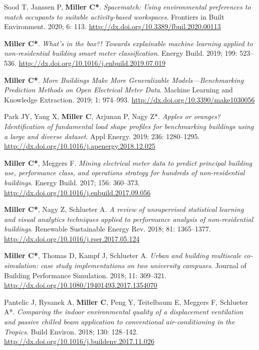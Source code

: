 \documentclass[10pt,a4paper]{article}
\begin{document}
\begin{small}
\begin{etaremune}
\item
Sood T, Janssen P, \textbf{Miller C*}. \emph{Spacematch: Using environmental preferences to match occupants to suitable activity-based workspaces}. Frontiers in Built Environment. 2020; 6: 113. \url{http://dx.doi.org/10.3389/fbuil.2020.00113}
\item
\textbf{Miller C*}. \emph{What’s in the box?! Towards explainable machine learning applied to non-residential building smart meter classification}. Energy Build. 2019; 199: 523–536. \url{http://dx.doi.org/10.1016/j.enbuild.2019.07.019}
\item
\textbf{Miller C*}. \emph{More Buildings Make More Generalizable Models—Benchmarking Prediction Methods on Open Electrical Meter Data}. Machine Learning and Knowledge Extraction. 2019; 1: 974–993. \url{http://dx.doi.org/10.3390/make1030056}
\item
Park JY, Yang X, \textbf{Miller C}, Arjunan P, Nagy Z*. \emph{Apples or oranges? Identification of fundamental load shape profiles for benchmarking buildings using a large and diverse dataset}. Appl Energy. 2019; 236: 1280–1295. \url{http://dx.doi.org/10.1016/j.apenergy.2018.12.025}
\item
\textbf{Miller C*}, Meggers F. \emph{Mining electrical meter data to predict principal building use, performance class, and operations strategy for hundreds of non-residential buildings}. Energy Build. 2017; 156: 360–373. \url{http://dx.doi.org/10.1016/j.enbuild.2017.09.056}%
\item
\textbf{Miller C*}, Nagy Z, Schlueter A. \emph{A review of unsupervised statistical learning and visual analytics techniques applied to performance analysis of non-residential buildings}. Renewable Sustainable Energy Rev. 2018; 81: 1365–1377. \url{http://dx.doi.org/10.1016/j.rser.2017.05.124}
\item
\textbf{Miller C*}, Thomas D, Kampf J, Schlueter A. \emph{Urban and building multiscale co-simulation: case study implementations on two university campuses}. Journal of Building Performance Simulation. 2018; 11: 309–321. \url{http://dx.doi.org/10.1080/19401493.2017.1354070}
\item
Pantelic J, Rysanek A, \textbf{Miller C}, Peng Y, Teitelbaum E, Meggers F, Schlueter A*. \emph{Comparing the indoor environmental quality of a displacement ventilation and passive chilled beam application to conventional air-conditioning in the Tropics}. Build Environ. 2018; 130: 128–142. \url{http://dx.doi.org/10.1016/j.buildenv.2017.11.026}

\end{etaremune}
\end{small}
\end{document}
